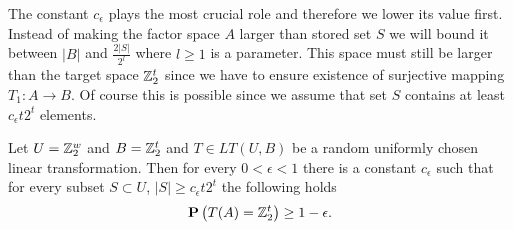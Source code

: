 The constant $c_\epsilon$ plays the most crucial role and therefore we lower its value first. Instead of making the factor space $A$ larger than stored set $S$ we will bound it between $|B|$ and $\frac{2|S|}{2 ^ l}$ where $l \geq 1$ is a parameter. This space must still be larger than the target space $\mathbb{Z}_{2}^{t}$ since we have to ensure existence of surjective mapping $T_1: A \rightarrow B$. Of course this is possible since we assume that set $S$ contains at least $c_\epsilon t 2^t$ elements.

\begin{remark}
\label{remark-better-c-e}
Let $U = \mathbb{Z}_{2}^{w}$ and $B = \mathbb{Z}_{2}^{t}$ and $T \in LT(U, B)$ be a random uniformly chosen linear transformation. Then for every $0 < \epsilon < 1$ there is a constant $c_\epsilon$ such that for every subset $S \subset U$, $|S| \geq c_\epsilon t 2^t$ the following holds
\[
\mathbf{P}\left(T(A) = \mathbb{Z}_{2}^{t}\right) \geq 1 - \epsilon \text{.}
\]
\end{remark}
